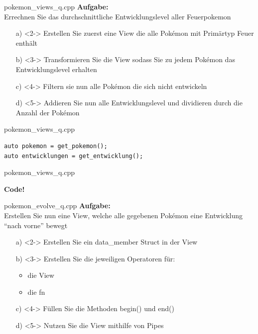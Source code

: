 \begin{frame}{pokemon\_views\_q.cpp}
    \textbf{Aufgabe:}\\
    Errechnen Sie das durchschnittliche Entwicklungslevel aller Feuerpokemon

    \vspace{1.5em}

    \begin{enumerate} %
        \item[a)]<2-> Erstellen Sie zuerst eine View die alle Pokémon mit Primärtyp Feuer enthält
        \item[b)]<3-> Transformieren Sie die View sodass Sie zu jedem Pokémon das Entwicklungslevel erhalten
        \item[c)]<4-> Filtern sie nun alle Pokémon die sich nicht entwickeln
        \item[d)]<5-> Addieren Sie nun alle Entwicklungslevel und dividieren durch die Anzahl der Pokémon
    \end{enumerate}
\end{frame}

\begin{frame}[fragile]{pokemon\_views\_q.cpp}
    \begin{verbatim}
auto pokemon = get_pokemon();
auto entwicklungen = get_entwicklung();
    \end{verbatim}
\end{frame}

\begin{frame}{pokemon\_views\_q.cpp}
    \begin{center}
        \textbf{Code!}
    \end{center}
\end{frame}

\begin{frame}{pokemon\_evolve\_q.cpp}
    \textbf{Aufgabe:}\\
    Erstellen Sie nun eine View, welche alle gegebenen Pokémon eine Entwicklung \enquote{nach vorne} bewegt

    \vspace{1.5em}

    \begin{enumerate} %
        \item[a)]<2-> Erstellen Sie ein data\_member Struct in der View
        \item[b)]<3-> Erstellen Sie die jeweiligen Operatoren für:

        \begin{itemize}
            \item die View
            \item die fn
        \end{itemize}
        \item[c)]<4-> Füllen Sie die Methoden begin() und end()
        \item[d)]<5-> Nutzen Sie die View mithilfe von Pipes
    \end{enumerate}
\end{frame}

